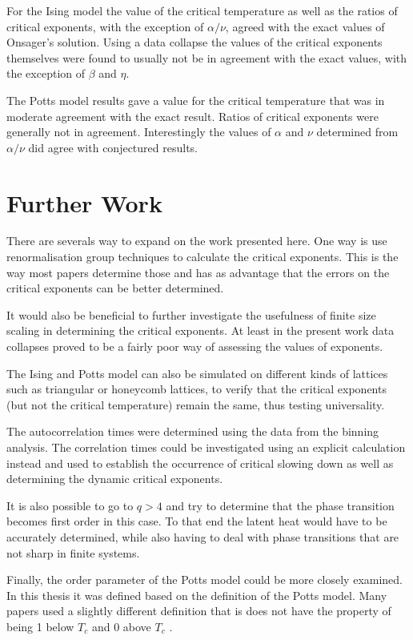 \documentclass[11pt, a4paper]{report} %
\begin{document}
For the Ising model the value of the critical temperature as well as the ratios of critical exponents, with the exception of \(\alpha/\nu\), agreed with the exact values of Onsager's solution.
Using a data collapse the values of the critical exponents themselves were found to usually not be in agreement with the exact values, with the exception of \(\beta\) and \(\eta\).

The Potts model results gave a value for the critical temperature that was in moderate agreement with the exact result.
Ratios of critical exponents were generally not in agreement.
Interestingly the values of \(\alpha\) and \(\nu\) determined from \(\alpha /\nu\) did agree with conjectured results.


\section{Further Work}
There are severals way to expand on the work presented here.
One way is use renormalisation group techniques to calculate the critical exponents.
This is the way most papers determine those and has as advantage that the errors on the critical exponents can be better determined.

It would also be beneficial to further investigate the usefulness of finite size scaling in determining the critical exponents.
At least in the present work data collapses proved to be a fairly poor way of assessing the values of exponents.

The Ising and Potts model can also be simulated on different kinds of lattices such as triangular or honeycomb lattices, to verify that the critical exponents (but not the critical temperature) remain the same, thus testing universality.

The autocorrelation times were determined using the data from the binning analysis.
The correlation times could be investigated using an explicit calculation instead and used to establish the occurrence of critical slowing down as well as determining the dynamic critical exponents.

It is also possible to go to \(q > 4\) and try to determine that the phase transition becomes first order in this case.
To that end the latent heat would have to be accurately determined, while also having to deal with phase transitions that are not sharp in finite systems.

Finally, the order parameter of the Potts model could be more closely examined.
In this thesis it was defined based on the definition of the Potts model.
Many papers used a slightly different definition that is does not have the property of being 1 below \(T_c\) and 0 above \(T_c\) \cite{binder:1981a,wu:1982,fan:2007}.



% 
% 
\printbibliography
\end{document}
